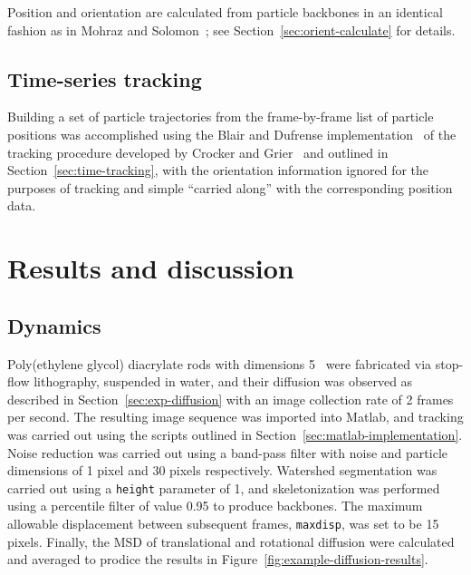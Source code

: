 Position and orientation are calculated from particle backbones 
in an identical fashion as in Mohraz and Solomon~\cite{rods-mohraz}; see
Section~\ref{sec:orient-calculate} for details.

\subsection{Time-series tracking}

Building a set of particle trajectories from the frame-by-frame list of particle positions
was accomplished using the Blair and Dufrense implementation~\cite{blair-dufrense-matlab} of 
the tracking procedure developed by Crocker and Grier~\cite{crocker-grier-spheres} and outlined 
in Section~\ref{sec:time-tracking}, with the orientation information ignored for the purposes of
tracking and simple ``carried along'' with the corresponding position data.


\section{Results and discussion}
\label{sec:track-results}

\subsection{Dynamics}


Poly(ethylene glycol) diacrylate rods with dimensions 5   \microns~were fabricated via 
stop-flow lithography, suspended in 
water, and their diffusion was observed as described in Section~\ref{sec:exp-diffusion} with an 
image collection
rate of 2 
frames per second.  The resulting image sequence was imported into Matlab, and tracking was carried out
using the scripts outlined in Section~\ref{sec:matlab-implementation}.  Noise reduction was carried out using 
a band-pass filter with noise and particle dimensions of 1 pixel and 30 pixels respectively. 
Watershed segmentation was carried out using a \texttt{height} parameter of 1, and skeletonization
was performed using a percentile filter of value 0.95 to produce backbones.  The maximum allowable 
displacement between subsequent frames, \texttt{maxdisp}, was set to be 15 pixels.  Finally, the 
MSD of translational and rotational diffusion were calculated and averaged to prodice the results in 
Figure~\ref{fig:example-diffusion-results}.

